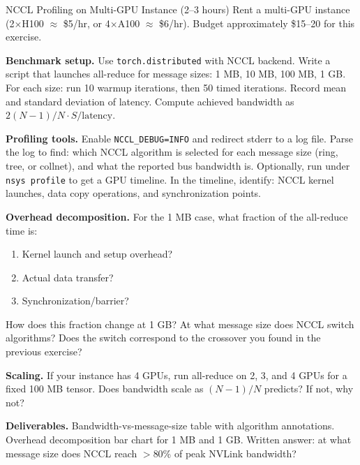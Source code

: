 \begin{exercise}{NCCL Profiling on Multi-GPU Instance (2--3 hours)}
Rent a multi-GPU instance (2$\times$H100 $\approx$ \$5/hr, or 4$\times$A100 $\approx$ \$6/hr).
Budget approximately \$15--20 for this exercise.

\medskip
\textbf{Benchmark setup.}
Use \texttt{torch.distributed} with NCCL backend.
Write a script that launches all-reduce for message sizes:
1 MB, 10 MB, 100 MB, 1 GB.
For each size: run 10 warmup iterations, then 50 timed iterations.
Record mean and standard deviation of latency.
Compute achieved bandwidth as $2(N-1)/N \cdot S / \text{latency}$.

\medskip
\textbf{Profiling tools.}
Enable \texttt{NCCL\_DEBUG=INFO} and redirect stderr to a log file.
Parse the log to find: which NCCL algorithm is selected for each message size (ring, tree, or
collnet), and what the reported bus bandwidth is.
Optionally, run under \texttt{nsys profile} to get a GPU timeline.
In the timeline, identify: NCCL kernel launches, data copy operations, and synchronization points.

\medskip
\textbf{Overhead decomposition.}
For the 1 MB case, what fraction of the all-reduce time is:
\begin{enumerate}
  \item Kernel launch and setup overhead?
  \item Actual data transfer?
  \item Synchronization/barrier?
\end{enumerate}
How does this fraction change at 1 GB?
At what message size does NCCL switch algorithms?
Does the switch correspond to the crossover you found in the previous exercise?

\medskip
\textbf{Scaling.}
If your instance has 4 GPUs, run all-reduce on 2, 3, and 4 GPUs for a fixed 100 MB tensor.
Does bandwidth scale as $(N-1)/N$ predicts?
If not, why not?

\medskip
\textbf{Deliverables.} Bandwidth-vs-message-size table with algorithm annotations.
Overhead decomposition bar chart for 1 MB and 1 GB.
Written answer: at what message size does NCCL reach $>$80\% of peak NVLink bandwidth?
\end{exercise}

